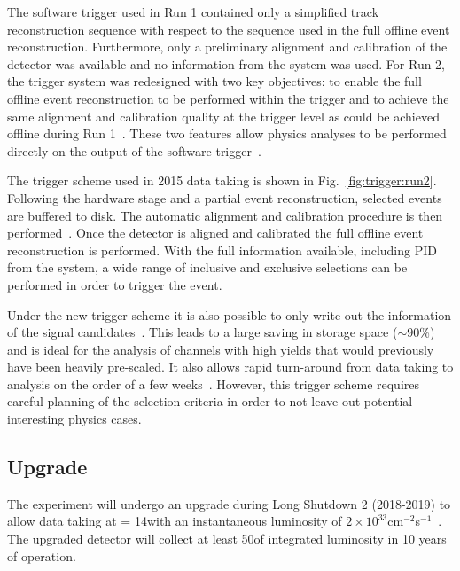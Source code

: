 The software trigger used in Run 1 contained only a simplified track reconstruction sequence with respect to the sequence used in the full offline event reconstruction. Furthermore, only a preliminary alignment and calibration of the detector was available and no information from the \rich system was used. For Run 2, the trigger system was redesigned with two key objectives: to enable the full offline event reconstruction to be performed within the trigger and to achieve the same alignment and calibration quality at the trigger level as could be achieved offline during Run 1~\cite{hlt-run2}. These two features allow physics analyses to be performed directly on the output of the software trigger~\cite{turbo}.

The trigger scheme used in 2015 data taking is shown in Fig.~\ref{fig:trigger:run2}. Following the hardware stage and a partial event reconstruction, selected events are buffered to disk. The automatic alignment and calibration procedure is then performed~\cite{alignment}. Once the detector is aligned and calibrated the full offline event reconstruction is performed. With the full information available, including PID from the \rich system, a wide range of inclusive and exclusive selections can be performed in order to trigger the event.

 Under the new trigger scheme it is also possible to only write out the information of the signal candidates~\cite{turbo}. This leads to a large saving in storage space ($\sim 90$\%) and is ideal for the analysis of channels with high yields that would previously have been heavily pre-scaled. It also allows rapid turn-around from data taking to analysis on the order of a few weeks~\cite{LHCb-PAPER-2015-037,LHCb-PAPER-2015-041}. However, this trigger scheme requires careful planning of the selection criteria in order to not leave out potential interesting physics cases.

\subsection{\lhcb Upgrade}
\label{sec:lhcb:lhcb-upgrade}

The \lhcb experiment will undergo an upgrade during Long Shutdown 2 (2018-2019) to allow data taking at \sqs = 14\tev with an instantaneous luminosity of $2\times10^{33}$cm$^{-2}$s$^{-1}$~\cite{upgrade-loi,LHCb-TDR-012}. The upgraded detector will collect at least 50\invfb of integrated luminosity in 10 years of operation.

